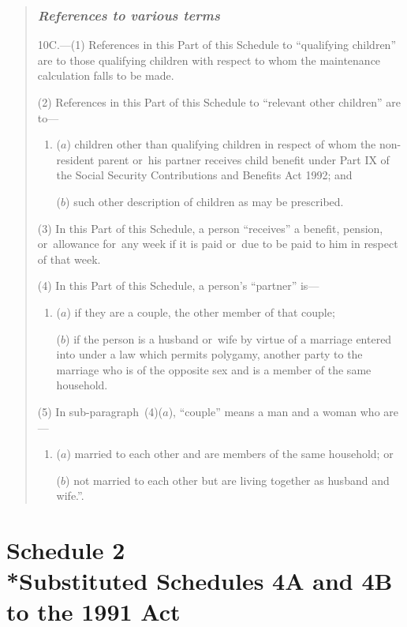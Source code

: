 \documentclass[12pt,a4paper]{article}
\begin{document}
\begin{quotation}
\section*{\itshape References to various terms}

10C.---(1) References in this Part of this Schedule to “qualifying children” are to those qualifying children with respect to whom the maintenance calculation falls to be made.

(2) References in this Part of this Schedule to “relevant other children” are to—
\begin{enumerate}\item[]
($a$) children other than qualifying children in respect of whom the non-resident parent or~his partner receives child benefit under Part IX of the Social Security Contributions and Benefits Act 1992; and

($b$) such other description of children as may be prescribed.
\end{enumerate}

(3) In this Part of this Schedule, a person “receives” a benefit, pension, or~allowance for~any week if it is paid or~due to be paid to him in respect of that week.

(4) In this Part of this Schedule, a person’s “partner” is—
\begin{enumerate}\item[]
($a$) if they are a couple, the other member of that couple;

($b$) if the person is a husband or~wife by virtue of a marriage entered into under a law which permits polygamy, another party to the marriage who is of the opposite sex and is a member of the same household.
\end{enumerate}

(5) In sub-paragraph~(4)($a$), “couple” means a man and a woman who are—
\begin{enumerate}\item[]
($a$) married to each other and are members of the same household; or

($b$) not married to each other but are living together as husband and wife.”.
\end{enumerate}
\end{quotation}

\part[Schedule 2 --- Substituted Schedules 4A and 4B to the 1991 Act]{Schedule 2\\*Substituted Schedules 4A and 4B to the 1991 Act}
\end{document}
